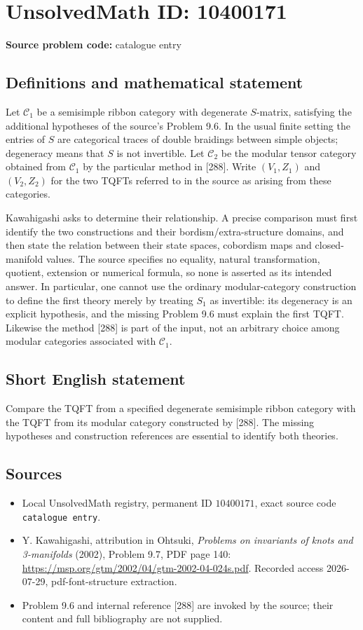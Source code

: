 \documentclass[11pt]{article}
\begin{document}
\section*{UnsolvedMath ID: 10400171}
\textbf{Source problem code:} catalogue entry
\subsection{Definitions and mathematical statement}
Let \(\mathcal C_1\) be a semisimple ribbon category with degenerate \(S\)-matrix, satisfying the additional hypotheses of the source's Problem 9.6. In the usual finite setting the entries of \(S\) are categorical traces of double braidings between simple objects; degeneracy means that \(S\) is not invertible. Let \(\mathcal C_2\) be the modular tensor category obtained from \(\mathcal C_1\) by the particular method in [288]. Write \((V_1,Z_1)\) and \((V_2,Z_2)\) for the two TQFTs referred to in the source as arising from these categories.

Kawahigashi asks to determine their relationship. A precise comparison must first identify the two constructions and their bordism/extra-structure domains, and then state the relation between their state spaces, cobordism maps and closed-manifold values. The source specifies no equality, natural transformation, quotient, extension or numerical formula, so none is asserted as its intended answer. In particular, one cannot use the ordinary modular-category construction to define the first theory merely by treating \(S_1\) as invertible: its degeneracy is an explicit hypothesis, and the missing Problem 9.6 must explain the first TQFT. Likewise the method [288] is part of the input, not an arbitrary choice among modular categories associated with \(\mathcal C_1\).
\subsection{Short English statement}
Compare the TQFT from a specified degenerate semisimple ribbon category with the TQFT from its modular category constructed by [288]. The missing hypotheses and construction references are essential to identify both theories.
\subsection{Sources}
\begin{itemize}
\item Local UnsolvedMath registry, permanent ID \(10400171\), exact source code \texttt{catalogue entry}.
\item Y. Kawahigashi, attribution in Ohtsuki, \emph{Problems on invariants of knots and 3-manifolds} (2002), Problem 9.7, PDF page 140: \url{https://msp.org/gtm/2002/04/gtm-2002-04-024s.pdf}. Recorded access 2026-07-29, pdf-font-structure extraction.
\item Problem 9.6 and internal reference [288] are invoked by the source; their content and full bibliography are not supplied.
\end{itemize}
\end{document}
